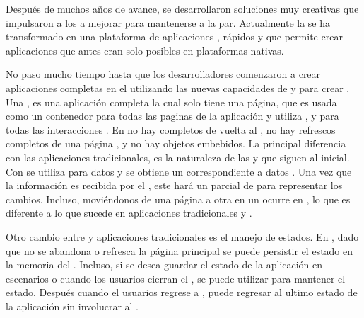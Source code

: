Después de muchos años de avance, se desarrollaron soluciones muy creativas que impulsaron a los \browsers a mejorar para mantenerse a la par. 
Actualmente la \webINT se ha transformado en una plataforma de aplicaciones \fullyfeatured, \runtimes \javaScriptNAME rápidos y \standard \htmlfive que permite crear aplicaciones que antes eran solo posibles en plataformas nativas.

No paso mucho tiempo hasta que los desarrolladores comenzaron a crear aplicaciones completas en el \browser utilizando las nuevas capacidades de \javaScriptNAME y \htmlfive para crear \singlePageApp. Una \spa, es una aplicación \webINT completa la cual solo tiene una página, que es usada como un contenedor para todas las paginas \webINT de la aplicación y utiliza \javaScriptNAME, \htmlfive y \cssNAME para todas las interacciones \frontEndsAS. En \spas no hay \posts completos de vuelta al \serverAS, no hay refrescos completos de una página \webINT, y no hay objetos embebidos. La principal diferencia con las aplicaciones \webINT tradicionales, es la naturaleza de las \requests y \responses que siguen al \requestINT \httpNAME inicial. Con \spa se utiliza \ajax para \requestINT datos y se obtiene un \response correspondiente a datos \json. Una vez que la información es recibida por el \clientAS, este hará un \render parcial de \htmlNAME para representar los cambios. Incluso, moviéndonos de una página a otra en un \spa ocurre en \clientSide, lo que es diferente a lo que sucede en aplicaciones tradicionales y \ria.

Otro cambio entre \spa y aplicaciones \webINT tradicionales es el manejo de estados. En \spa, dado que no se abandona o refresca la página \webINT principal se puede persistir el estado en la memoria del \browser. Incluso, si se desea guardar el estado de la aplicación en escenarios \offline o cuando los usuarios cierran el \browser, se puede utilizar \htmlfive \storage para mantener el estado. Después cuando el usuarios regrese a \online, puede regresar al ultimo estado de la aplicación sin involucrar al \serverAS.

